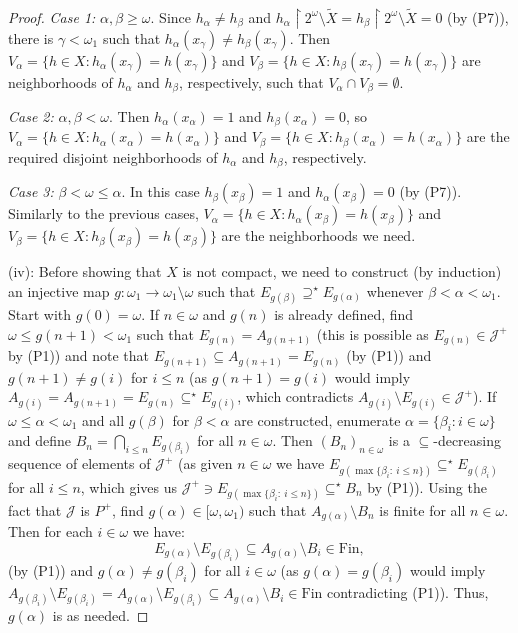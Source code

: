 \documentclass{amsart}
\theoremstyle{plain}
\theoremstyle{definition}
\theoremstyle{remark}
\newcommand{\cJ}{\mathcal{J}}
\newcommand{\J}{\cJ}
\newcommand{\Fin}{\mathrm{Fin}}
\begin{document}
\begin{proof}
\textit{Case 1:} $\alpha,\beta \geq \omega$. Since $h_\alpha\neq h_\beta$ and $h_\alpha\restriction 2^\omega\setminus \tilde{X}=h_\beta\restriction 2^\omega\setminus \tilde{X}=0$ (by (P7)), there is $\gamma<\omega_1$ such that $h_\alpha(x_\gamma)\neq h_\beta(x_\gamma)$. Then $V_\alpha=\{h \in X : h_\alpha(x_\gamma)=h(x_\gamma)\}$ and $V_\beta=\{h \in X : h_\beta(x_\gamma)=h(x_\gamma)\}$ are neighborhoods of $h_\alpha$ and $h_\beta$, respectively, such that $V_\alpha\cap V_\beta=\emptyset$. 

\smallskip

\textit{Case 2:} $\alpha,\beta<\omega$. Then $h_\alpha(x_\alpha)=1$ and $h_\beta(x_\alpha)=0$, so $V_\alpha=\{h \in X : h_\alpha(x_\alpha)=h(x_\alpha)\}$ and $V_\beta=\{h \in X : h_\beta(x_\alpha)=h(x_\alpha)\}$ are the required disjoint neighborhoods of $h_\alpha$ and $h_\beta$, respectively.

\smallskip

\textit{Case 3:} $\beta<\omega\leq\alpha$. In this case $h_\beta(x_\beta)=1$ and $h_\alpha(x_\beta)=0$ (by (P7)). Similarly to the previous cases, $V_\alpha=\{h \in X : h_\alpha(x_\beta)=h(x_\beta)\}$ and $V_\beta=\{h \in X : h_\beta(x_\beta)=h(x_\beta)\}$ are the neighborhoods we need.

\medskip

(iv): Before showing that $X$ is not compact, we need to construct (by induction) an injective map $g:\omega_1\to\omega_1\setminus\omega$ such that $E_{g(\beta)}\supseteq^\star E_{g(\alpha)}$ whenever $\beta<\alpha<\omega_1$. Start with $g(0)=\omega$. If $n\in\omega$ and $g(n)$ is already defined, find $\omega\leq g(n+1)<\omega_1$ such that $E_{g(n)}=A_{g(n+1)}$ (this is possible as $E_{g(n)}\in\J^+$ by (P1)) and note that $E_{g(n+1)}\subseteq A_{g(n+1)}=E_{g(n)}$ (by (P1)) and $g(n+1)\neq g(i)$ for $i\leq n$ (as $g(n+1)=g(i)$ would imply $A_{g(i)}=A_{g(n+1)}=E_{g(n)}\subseteq^\star E_{g(i)}$, which contradicts $A_{g(i)}\setminus E_{g(i)}\in\J^+$). If $\omega\leq\alpha<\omega_1$ and all $g(\beta)$ for $\beta<\alpha$ are constructed, enumerate $\alpha=\{\beta_i: i\in\omega\}$ and define $B_n=\bigcap_{i\leq n}E_{g(\beta_i)}$ for all $n\in\omega$. Then $(B_n)_{n\in\omega}$ is a $\subseteq$-decreasing sequence of elements of $\J^+$ (as given $n\in\omega$ we have $E_{g(\max\{\beta_i:\ i\leq n\})}\subseteq^\star E_{g(\beta_i)}$ for all $i\leq n$, which gives us $\J^+\ni E_{g(\max\{\beta_i:\ i\leq n\})}\subseteq^\star B_n$ by (P1)). Using the fact that $\J$ is $P^+$, find $g(\alpha)\in[\omega,\omega_1)$ such that $A_{g(\alpha)}\setminus B_n$ is finite for all $n\in\omega$. Then for each $i\in\omega$ we have:
\[
E_{g(\alpha)}\setminus E_{g(\beta_i)}\subseteq A_{g(\alpha)}\setminus B_i\in\Fin,
\]
(by (P1)) and $g(\alpha)\neq g(\beta_i)$ for all $i\in\omega$ (as $g(\alpha)=g(\beta_i)$ would imply $A_{g(\beta_i)}\setminus E_{g(\beta_i)}=A_{g(\alpha)}\setminus E_{g(\beta_i)}\subseteq A_{g(\alpha)}\setminus B_i\in\Fin$ contradicting (P1)). Thus, $g(\alpha)$ is as needed.


\end{proof}
\end{document}
